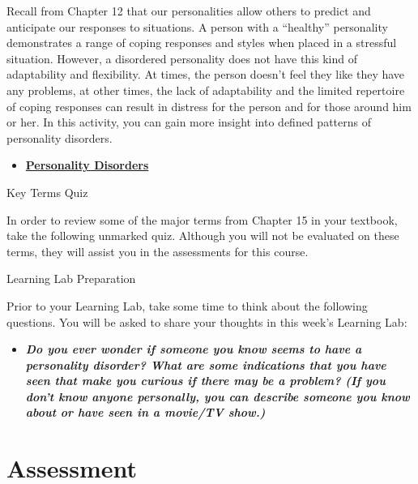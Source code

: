\documentclass[
]{book}
\providecommand{\tightlist}{%
  \setlength{\itemsep}{0pt}\setlength{\parskip}{0pt}}
\begin{document}
\begin{reflect}
Recall from Chapter 12 that our personalities allow others to predict and anticipate our responses to situations. A person with a ``healthy'' personality demonstrates a range of coping responses and styles when placed in a stressful situation. However, a disordered personality does not have this kind of adaptability and flexibility. At times, the person doesn't feel they like they have any problems, at other times, the lack of adaptability and the limited repertoire of coping responses can result in distress for the person and for those around him or her. In this activity, you can gain more insight into defined patterns of personality disorders.

\begin{itemize}
\tightlist
\item
  \href{https://www.camh.ca/en/health-info/mental-illness-and-addiction-index/personality-disorders}{\textbf{Personality Disorders}}
\end{itemize}

{Key Terms Quiz}

In order to review some of the major terms from Chapter 15 in your textbook, take the following unmarked quiz. Although you will not be evaluated on these terms, they will assist you in the assessments for this course.

{Learning Lab Preparation}

Prior to your Learning Lab, take some time to think about the following questions. You will be asked to share your thoughts in this week's Learning Lab:

\begin{itemize}
\tightlist
\item
  \textbf{\emph{Do you ever wonder if someone you know seems to have a personality disorder? What are some indications that you have seen that make you curious if there may be a problem? (If you don't know anyone personally, you can describe someone you know about or have seen in a movie/TV show.)}}
\end{itemize}
\end{reflect}

\hypertarget{assessment-9}{%
\section*{Assessment}\label{assessment-9}}
\end{document}
